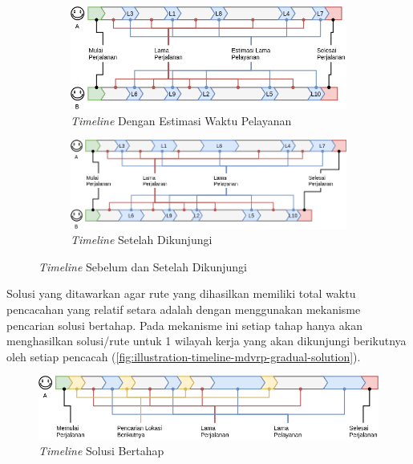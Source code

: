 \begin{figure}[!]
	\centering
	\begin{subfigure}[t]{12.5cm}
		\centering
		\includegraphics[width=\textwidth]{Resources/Images/illustration-timeline-mdvrp-timeservice-estimation}
		\caption{\textit{Timeline} Dengan Estimasi Waktu Pelayanan}
		\label{fig:illustration-timeline-mdvrp-timeservice-estimation}
	\end{subfigure}%
	
	\begin{subfigure}[t]{\textwidth}
		\centering
		\includegraphics[width=\textwidth]{Resources/Images/illustration-timeline-mdvrp-timeservice-real}
		\caption{\textit{Timeline} Setelah Dikunjungi}
		\label{fig:illustration-timeline-mdvrp-timeservice-real}
	\end{subfigure}%
	\captionsetup{format=hang}
	\caption{\textit{Timeline} Sebelum dan Setelah Dikunjungi}
	\label{fig:illustration-timeline-mdvrp}
\end{figure}


Solusi yang ditawarkan agar rute yang dihasilkan memiliki total waktu pencacahan yang relatif setara adalah dengan menggunakan mekanisme pencarian solusi bertahap. Pada mekanisme ini setiap tahap hanya akan menghasilkan solusi/rute untuk 1 wilayah kerja yang akan dikunjungi berikutnya oleh setiap pencacah (\autoref{fig:illustration-timeline-mdvrp-gradual-solution}). 


\begin{figure}[!]
	\centering
	\includegraphics[width=\textwidth]{Resources/Images/illustration-timeline-mdvrp-gradual-solution}
	\captionsetup{format=hang}
	\caption{\textit{Timeline} Solusi Bertahap}
	\label{fig:illustration-timeline-mdvrp-gradual-solution}
\end{figure}


